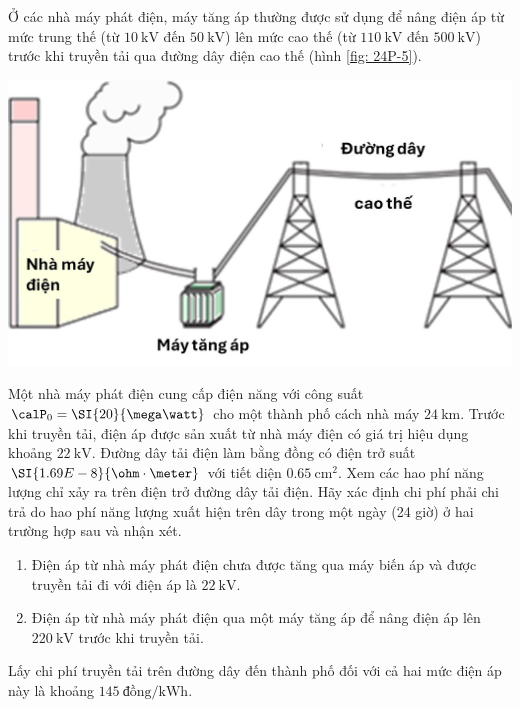 \begin{ex}
	Ở các nhà máy phát điện, máy tăng áp thường được sử dụng để nâng điện áp từ mức trung thế (từ $\SI{10}{\kilo\volt}$ đến $\SI{50}{\kilo\volt}$) lên mức cao thế (từ $\SI{110}{\kilo\volt}$ đến $\SI{500}{\kilo\volt}$) trước khi truyền tải qua đường dây điện cao thế (hình \ref{fig: 24P-5}).
	\begin{center}
		\includegraphics[width=0.4\linewidth]{figs/VN12-Y24-PH-SYL-024P-5}
		\label{fig: 24P-5}
	\end{center}
	Một nhà máy phát điện cung cấp điện năng với công suất $\calP_0=\SI{20}{\mega\watt}$ cho một thành phố cách nhà máy $\SI{24}{\kilo\meter}$. Trước khi truyền tải, điện áp được sản xuất từ nhà máy điện có giá trị hiệu dụng khoảng $\SI{22}{\kilo\volt}$. Đường dây tải điện làm bằng đồng có điện trở suất $\SI{1.69E-8}{\ohm\cdot\meter}$ với tiết diện $\SI{0.65}{\centi\meter^2}$. Xem các hao phí năng lượng chỉ xảy ra trên điện trở đường dây tải điện. Hãy xác định chi phí phải chi trả do hao phí năng lượng xuất hiện trên dây trong một ngày (24 giờ) ở hai trường hợp sau và nhận xét.
	\begin{enumerate}[label=\alph*)]
		\item Điện áp từ nhà máy phát điện chưa được tăng qua máy biến áp và được truyền tải đi với điện áp là $\SI{22}{\kilo\volt}$.
		\item  Điện áp từ nhà máy phát điện qua một máy tăng áp để nâng điện áp lên $\SI{220}{\kilo\volt}$ trước khi truyền tải.
	\end{enumerate}
	Lấy chi phí truyền tải trên đường dây đến thành phố đối với cả hai mức điện áp này là khoảng $\SI{145}{\text{đồng}/\kilo\watt\hour}$.
\end{ex}
